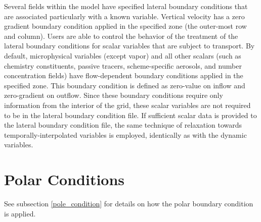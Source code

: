 Several fields within the model have specified lateral boundary conditions that are 
associated particularly with a known variable.
Vertical velocity has a zero gradient boundary condition applied in the
specified zone (the outer-most row and column).
Users are able to control the behavior of the treatment of the lateral boundary conditions
for scalar variables that are subject to transport. 
By default, microphysical variables (except vapor) and all other scalars 
(such as chemistry constituents, passive tracers, scheme-specific aerosols, and number concentration fields)
have flow-dependent boundary
conditions applied in the specified zone. This boundary condition is defined as zero-value on inflow
and zero-gradient on outflow. Since these boundary conditions require only information from
the interior of the grid, these scalar variables are not required to be in the lateral boundary condition file.
If sufficient scalar data is provided to the lateral boundary condition file, the same technique of
relaxation
towards temporally-interpolated variables is employed, identically as with the
dynamic variables.

\section{Polar Conditions}
See subsection \ref{pole_condition} for details on how the polar boundary
condition is applied.
